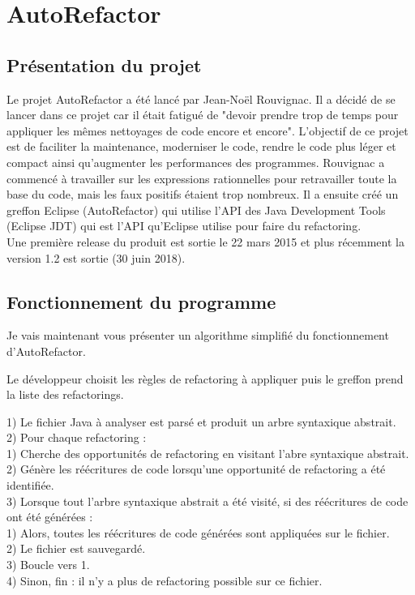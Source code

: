 \documentclass[a4paper,twoside,12pt,openright]{report}
\begin{document}
\newpage

\section{AutoRefactor}
\subsection{Présentation du projet}
Le projet AutoRefactor a été lancé par Jean-Noël Rouvignac. Il a décidé de se lancer dans ce projet car il était fatigué de "devoir prendre trop de temps pour appliquer les mêmes nettoyages de code encore et encore". L'objectif de ce projet est de faciliter la maintenance, moderniser le code, rendre le code plus léger et compact ainsi qu'augmenter les performances des programmes. Rouvignac a commencé à travailler sur les expressions rationnelles pour retravailler toute la base du code, mais les faux positifs étaient trop nombreux.\cite{ref7} Il a ensuite créé un greffon Eclipse (AutoRefactor) qui utilise  l'API des Java Development Tools (Eclipse JDT) qui est l'API qu'Eclipse utilise pour faire du refactoring.\\
Une première release du produit est sortie le 22 mars 2015 et plus récemment la version 1.2 est sortie (30 juin 2018).\\

\subsection{Fonctionnement du programme}
Je vais maintenant vous présenter un algorithme simplifié du fonctionnement d'AutoRefactor\cite{ref7}.

Le développeur choisit les règles de refactoring à appliquer puis le greffon prend la liste des refactorings.

1) Le fichier Java à analyser est parsé et produit un arbre syntaxique abstrait.\\

2) Pour chaque refactoring :\\
\tabto{0.8cm} 1) Cherche des opportunités de refactoring en visitant l'abre syntaxique abstrait.\\
\tabto{0.8cm} 2) Génère les réécritures de code lorsqu'une  opportunité de refactoring a été identifiée.\\

3) Lorsque tout l'arbre syntaxique abstrait a été visité, si des réécritures de code ont été générées :\\
\tabto{0.8cm} 1) Alors, toutes les réécritures de code générées sont appliquées sur le fichier.\\
\tabto{0.8cm} 2) Le fichier est sauvegardé.\\
\tabto{0.8cm} 3) Boucle vers 1.\\
\tabto{0.8cm} 4) Sinon, fin : il n'y a plus de refactoring possible sur ce fichier.\\
\end{document}
